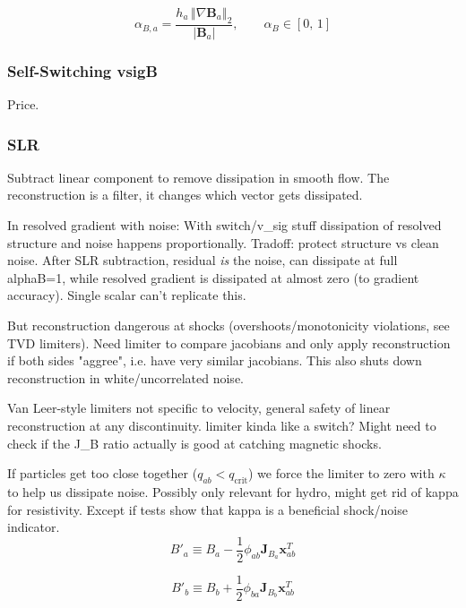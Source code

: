 \begin{equation}
\alpha_{B,a} = \frac{h_a\,\left\Vert \nabla\mathbf{B}_a \right\Vert_2}{|\mathbf{B}_a|}, \qquad \alpha_B \in [0,\,1]
\end{equation}

\subsubsection{Self-Switching vsigB}
Price. 

\subsubsection{SLR}
Subtract linear component to remove dissipation in smooth flow. The reconstruction is a filter, it changes which vector gets dissipated. 

In resolved gradient with noise: With switch/v\_sig stuff dissipation of resolved structure and noise happens proportionally. Tradoff: protect structure vs clean noise. After SLR subtraction, residual \textit{is} the noise, can dissipate at full alphaB=1, while resolved gradient is dissipated at almost zero (to gradient accuracy). Single scalar can't replicate this. 

But reconstruction dangerous at shocks (overshoots/monotonicity violations, see TVD limiters). Need limiter to compare jacobians and only apply reconstruction if both sides "aggree", i.e. have very similar jacobians. This also shuts down reconstruction in white/uncorrelated noise. 

Van Leer-style limiters not specific to velocity, general safety of linear reconstruction at any discontinuity. limiter kinda like a switch? 
Might need to check if the J\_B ratio actually is good at catching magnetic shocks. 

If particles get too close together ($q_{ab} < q_\text{crit}$) we force the limiter to zero with $\kappa$ to help us dissipate noise. Possibly only relevant for hydro, might get rid of kappa for resistivity. Except if tests show that kappa is a beneficial shock/noise indicator. 
\begin{equation}
B'_{a} \equiv B_{a} - \frac{1}{2} \phi_{ab} \mathbf{J}_{B_a} \mathbf{x}^T_{ab}
\end{equation}

\begin{equation}
B'_{b} \equiv B_{b} + \frac{1}{2} \phi_{ba} \mathbf{J}_{B_b} \mathbf{x}^T_{ab}
\end{equation}

